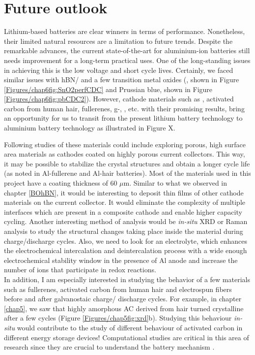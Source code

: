 \section{Future outlook}
Lithium-based batteries are clear winners in terms of performance. Nonetheless, their limited natural resources are a limitation to future trends. 
Despite the remarkable advances, the current state-of-the-art for aluminium-ion batteries still needs improvement for a long-term practical uses. One of the long-standing issues in achieving this is the low voltage and short cycle lives. Certainly, we faced similar issues with hBN/ and a few transition metal oxides (, shown in Figure \ref{Figures/chap6fig:SnO2perfCDC} and Prussian blue, shown in Figure \ref{Figures/chap6fig:pbCDC2}). However, cathode materials such as \cite{}, activated carbon from human hair, fullerenes, g-, , etc. with their promising results, bring an opportunity for us to transit from the present lithium battery technology to aluminium battery technology as illustrated in Figure X.

Following studies of these materials could include exploring porous, high surface area materials as cathodes coated on highly porous current collectors. This way, it may be possible to stabilize the crystal structures and obtain a longer cycle life (as noted in Al-fullerene and Al-hair batteries). Most of the materials used in this project have a coating thickness of 60 $\mu$m. Similar to what we observed in chapter \ref{BOhBN}, it would be interesting to deposit thin films of other cathode materials on the current collector. It would eliminate the complexity of multiple interfaces which are present in a composite cathode and enable higher capacity cycling. Another interesting method of analysis would be \textit{in-situ} XRD or Raman analysis to study the structural changes taking place inside the material during charge/discharge cycles. Also, we need to look for an electrolyte, which enhances the electrochemical intercalation and deintercalation process with a wide enough electrochemical stability window in the presence of Al anode \cite{jayaprakash_rechargeable_2011} and increase the number of ions that participate in redox reactions.\\
In addition, I am especially interested in studying the behavior of a few materials such as fullerenes, activated carbon from human hair and electrospun  fibers before and after galvanostaic charge/ discharge cycles. For example, in chapter \ref{chap5}, we saw that highly amorphous AC derived from hair turned crystalline after a few cycles (Figure \ref{Figures/chap5fig:xrd}b). Studying this behaviour \textit{in-situ} would contribute to the study of different behaviour of activated carbon in different energy storage devices! Computational studies are critical in this area of research since they are crucial to understand the battery mechanism \cite{bhauriyal_computational_2017,gao_understanding_2017-1,bhauriyal_staging_2017-1,agiorgousis_role_2017}. 

